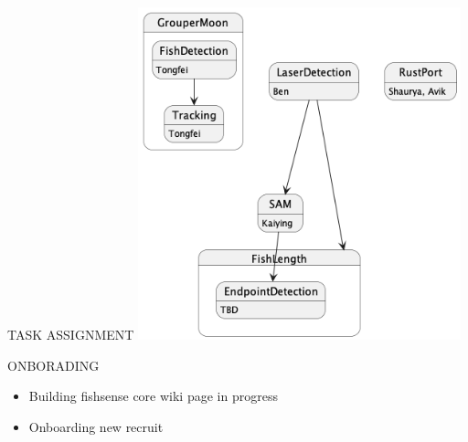 
\begin{frame}{TASK ASSIGNMENT}
    \centering
      \includegraphics[height=0.7\textheight,width=0.7\textwidth,keepaspectratio]{images/CorePlans.png}
 \end{frame}




\begin{frame}{ONBORADING}
     \begin{itemize}
         \item Building fishsense core wiki page in progress
         \item Onboarding new recruit 
     \end{itemize}    
 \end{frame}




